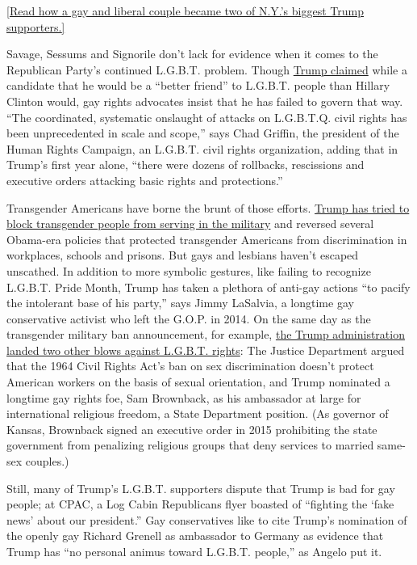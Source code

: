 \href{https://www.nytimes3xbfgragh.onion/2018/11/26/nyregion/gay-trump-supporters.html}{{[}Read
how a gay and liberal couple became two of N.Y.'s biggest Trump
supporters.{]}}

Savage, Sessums and Signorile don't lack for evidence when it comes to
the Republican Party's continued L.G.B.T. problem. Though
\href{https://www.nytimes3xbfgragh.onion/2016/06/15/us/politics/trump-immigration-rally-lgbt.html}{Trump
claimed} while a candidate that he would be a ``better friend'' to
L.G.B.T. people than Hillary Clinton would, gay rights advocates insist
that he has failed to govern that way. ``The coordinated, systematic
onslaught of attacks on L.G.B.T.Q. civil rights has been unprecedented
in scale and scope,'' says Chad Griffin, the president of the Human
Rights Campaign, an L.G.B.T. civil rights organization, adding that in
Trump's first year alone, ``there were dozens of rollbacks, rescissions
and executive orders attacking basic rights and protections.''

Transgender Americans have borne the brunt of those efforts.
\href{https://mashable.com/2017/07/26/donald-trump-transgender-military-tweet/}{Trump
has tried to block transgender people from serving in the military} and
reversed several Obama-era policies that protected transgender Americans
from discrimination in workplaces, schools and prisons. But gays and
lesbians haven't escaped unscathed. In addition to more symbolic
gestures, like failing to recognize L.G.B.T. Pride Month, Trump has
taken a plethora of anti-gay actions ``to pacify the intolerant base of
his party,'' says Jimmy LaSalvia, a longtime gay conservative activist
who left the G.O.P. in 2014. On the same day as the transgender military
ban announcement, for example,
\href{https://www.nytimes3xbfgragh.onion/2017/07/27/us/politics/white-house-lgbt-rights-military-civil-rights-act.html}{the
Trump administration landed two other blows against L.G.B.T. rights}:
The Justice Department argued that the 1964 Civil Rights Act's ban on
sex discrimination doesn't protect American workers on the basis of
sexual orientation, and Trump nominated a longtime gay rights foe, Sam
Brownback, as his ambassador at large for international religious
freedom, a State Department position. (As governor of Kansas, Brownback
signed an executive order in 2015 prohibiting the state government from
penalizing religious groups that deny services to married same-sex
couples.)

Still, many of Trump's L.G.B.T. supporters dispute that Trump is bad for
gay people; at CPAC, a Log Cabin Republicans flyer boasted of ``fighting
the `fake news' about our president.'' Gay conservatives like to cite
Trump's nomination of the openly gay Richard Grenell as ambassador to
Germany as evidence that Trump has ``no personal animus toward L.G.B.T.
people,'' as Angelo put it.

